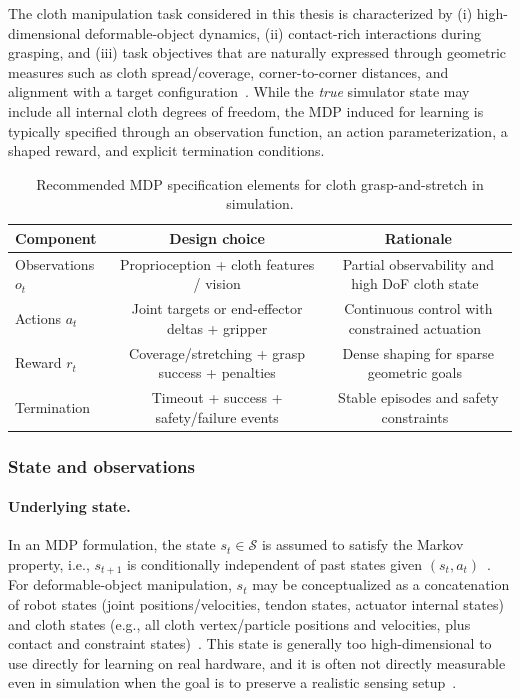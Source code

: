 The cloth manipulation task considered in this thesis is characterized by (i) high-dimensional deformable-object dynamics, (ii) contact-rich interactions during grasping, and (iii) task objectives that are naturally expressed through geometric measures such as cloth spread/coverage, corner-to-corner distances, and alignment with a target configuration~\cite{Lin2021SoftGym,Kadi2023ClothLikeReview,Seita2020FabricSmoothing}. While the \emph{true} simulator state may include all internal cloth degrees of freedom, the \ac{MDP} induced for learning is typically specified through an observation function, an action parameterization, a shaped reward, and explicit termination conditions.

\begin{table}[htb]
    \centering
    \caption{Recommended \ac{MDP} specification elements for cloth grasp-and-stretch in simulation.}\label{tab:cloth_mdp_summary}
    \begin{tabular}{l c c}
    \hline
    \textbf{Component} & \textbf{Design choice} & \textbf{Rationale} \\
    \hline
    Observations $o_t$ & Proprioception + cloth features / vision & Partial observability and high DoF cloth state~\cite{Lin2021SoftGym,Spaan2012POMDP} \\
    Actions $a_t$ & Joint targets or end-effector deltas + gripper & Continuous control with constrained actuation~\cite{Siciliano2009Robotics,isaaclab_mdp_terms_api} \\
    Reward $r_t$ & Coverage/stretching + grasp success + penalties & Dense shaping for sparse geometric goals~\cite{Lin2021SoftGym,Seita2020FabricSmoothing} \\
    Termination & Timeout + success + safety/failure events & Stable episodes and safety constraints~\cite{isaaclab_mdp_terms_api,isaaclab_envs_api} \\
    \hline
    \end{tabular}
\end{table}

\subsubsection{State and observations}

\paragraph{Underlying state.}
In an \ac{MDP} formulation, the state $s_t \in \mathcal{S}$ is assumed to satisfy the Markov property, i.e., $s_{t+1}$ is conditionally independent of past states given $(s_t,a_t)$~\cite{Puterman1994,SuttonBarto2018}. For deformable-object manipulation, $s_t$ may be conceptualized as a concatenation of robot states (joint positions/velocities, tendon states, actuator internal states) and cloth states (e.g., all cloth vertex/particle positions and velocities, plus contact and constraint states)~\cite{Lin2021SoftGym,Kadi2023ClothLikeReview}. This state is generally too high-dimensional to use directly for learning on real hardware, and it is often not directly measurable even in simulation when the goal is to preserve a realistic sensing setup~\cite{Lin2021SoftGym,Kadi2023ClothLikeReview}.

